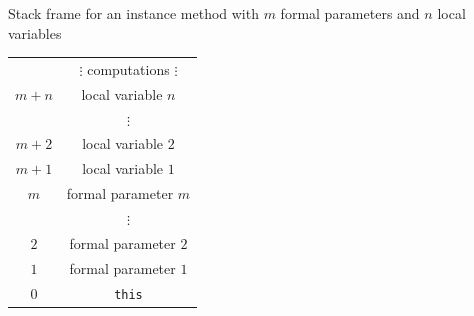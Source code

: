 \documentclass[8pt,a4paper,compress]{beamer}
\begin{document}
\begin{frame}[fragile]
\begin{overprint}
Stack frame for an instance method with $m$ formal parameters and $n$ local variables

\smallskip

\scriptsize{
\begin{center}
\begin{tabular}{c|c|} \cline{2-2}
& \makecell{$\vdots$ \\ computations \\ $\vdots$} \\ \cline{2-2}
$m+n$ & local variable $n$ \\ \cline{2-2}
& $\vdots$ \\ \cline{2-2}
$m+2$ & local variable $2$ \\ \cline{2-2}
$m+1$ & local variable $1$ \\ \cline{2-2}
$m$ & formal parameter $m$ \\ \cline{2-2}
& $\vdots$ \\ \cline{2-2}
$2$ & formal parameter $2$ \\ \cline{2-2}
$1$ & formal parameter $1$ \\ \cline{2-2}
$0$ & \texttt{this} \\ \cline{2-2}
\end{tabular}
\end{center}
}
\end{overprint}
\end{frame}
\end{document}
